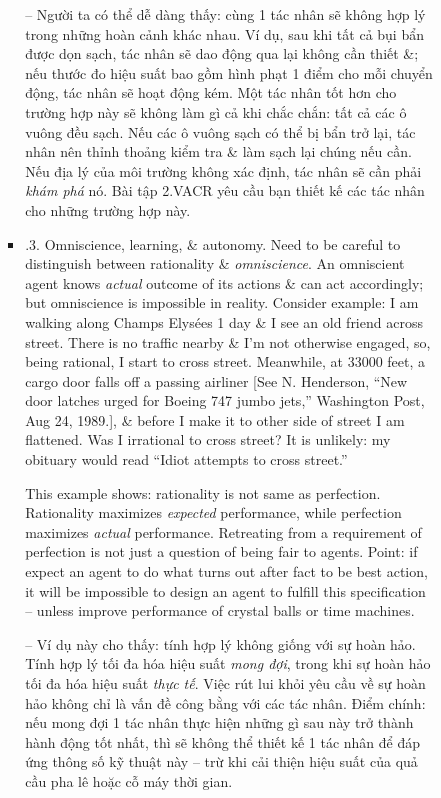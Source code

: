 \documentclass{article}
\begin{document}
\begin{itemize}
\begin{itemize}
\begin{itemize}
\begin{itemize}
				-- Người ta có thể dễ dàng thấy: cùng 1 tác nhân sẽ không hợp lý trong những hoàn cảnh khác nhau. Ví dụ, sau khi tất cả bụi bẩn được dọn sạch, tác nhân sẽ dao động qua lại không cần thiết \&; nếu thước đo hiệu suất bao gồm hình phạt 1 điểm cho mỗi chuyển động, tác nhân sẽ hoạt động kém. Một tác nhân tốt hơn cho trường hợp này sẽ không làm gì cả khi chắc chắn: tất cả các ô vuông đều sạch. Nếu các ô vuông sạch có thể bị bẩn trở lại, tác nhân nên thỉnh thoảng kiểm tra \& làm sạch lại chúng nếu cần. Nếu địa lý của môi trường không xác định, tác nhân sẽ cần phải {\it khám phá} nó. Bài tập 2.VACR yêu cầu bạn thiết kế các tác nhân cho những trường hợp này.
				\item {.3. Omniscience, learning, \& autonomy.} Need to be careful to distinguish between rationality \& {\it omniscience}. An omniscient agent knows {\it actual} outcome of its actions \& can act accordingly; but omniscience is impossible in reality. Consider example: I am walking along Champs Elysées 1 day \& I see an old friend across street. There is no traffic nearby \& I'm not otherwise engaged, so, being rational, I start to cross street. Meanwhile, at 33000 feet, a cargo door falls off a passing airliner [See {\sc N. Henderson}, ``New door latches urged for Boeing 747 jumbo jets,'' Washington Post, Aug 24, 1989.], \& before I make it to other side of street I am flattened. Was I irrational to cross street? It is unlikely: my obituary would read ``Idiot attempts to cross street.''
				
				This example shows: rationality is not same as perfection. Rationality maximizes {\it expected} performance, while perfection maximizes {\it actual} performance. Retreating from a requirement of perfection is not just a question of being fair to agents. Point: if expect an agent to do what turns out after fact to be best action, it will be impossible to design an agent to fulfill this specification -- unless improve performance of crystal balls or time machines.
				
				-- Ví dụ này cho thấy: tính hợp lý không giống với sự hoàn hảo. Tính hợp lý tối đa hóa hiệu suất {\it mong đợi}, trong khi sự hoàn hảo tối đa hóa hiệu suất {\it thực tế}. Việc rút lui khỏi yêu cầu về sự hoàn hảo không chỉ là vấn đề công bằng với các tác nhân. Điểm chính: nếu mong đợi 1 tác nhân thực hiện những gì sau này trở thành hành động tốt nhất, thì sẽ không thể thiết kế 1 tác nhân để đáp ứng thông số kỹ thuật này -- trừ khi cải thiện hiệu suất của quả cầu pha lê hoặc cỗ máy thời gian.
				

\end{itemize}
\end{itemize}
\end{itemize}
\end{itemize}
\end{document}
